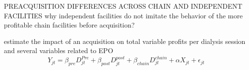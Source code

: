 \begin{frame}{PREACQUISITION DIFFERENCES ACROSS CHAIN AND INDEPENDENT FACILITIES}
why independent facilities do not imitate the behavior of the more profitable chain facilities before acquisition?

estimate the impact of an acquisition on total variable profits per dialysis session and several variables related to EPO
    $$Y_{jt} = \beta_{pre}D^{Pre}_{jt} + \beta_{post}D^{post}_{jt} + \beta_{chain}D^{chain}_{jt} + \alpha X_{jt} + \epsilon_{jt} $$
\end{frame}